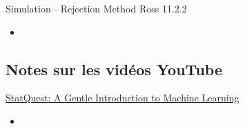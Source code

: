 \begin{CHPT_SUMM_AUTO_NUMB}[label = {L.-24}]{Simulation---Rejection Method}
Ross 11.2.2
	\begin{itemize}
		\item	
	\end{itemize}
\end{CHPT_SUMM_AUTO_NUMB}

\subsection{Notes sur les vidéos YouTube}

\begin{YTB_SUMM}[label = {SQ-BASICS-ML-INTRO}]{\href{https://www.youtube.com/watch?v=Gv9_4yMHFhI&list=PLblh5JKOoLUICTaGLRoHQDuF_7q2GfuJF&index=2&t=0s}{StatQuest: A Gentle Introduction to Machine Learning}}
\begin{itemize}
	\item	
\end{itemize}
\end{YTB_SUMM}
